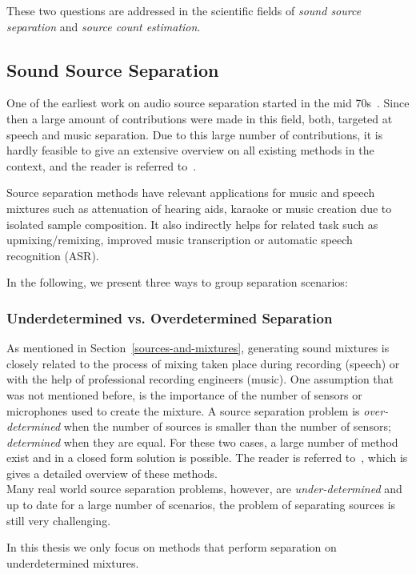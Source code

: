 These two questions are addressed in the scientific fields of \emph{sound source separation} and \emph{source count estimation}.

\subsection{Sound Source Separation}

One of the earliest work on audio source separation started in the mid 70s~\cite{miller73}.
Since then a large amount of contributions were made in this field, both, targeted at speech and music separation.
Due to this large number of contributions, it is hardly feasible to give an extensive overview on all existing methods in the context, and the reader is referred to~\cite{vincent18, comon10, rafii}.
\par
Source separation methods have relevant applications for music and speech mixtures such as attenuation of hearing aids, karaoke or music creation due to isolated sample composition.
It also indirectly helps for related task such as upmixing/remixing, improved music transcription or automatic speech recognition (ASR). 
\par
In the following, we present three ways to group separation scenarios:

\subsubsection*{Underdetermined vs. Overdetermined Separation}
As mentioned in Section~\ref{sources-and-mixtures}, generating sound mixtures is closely related to the process of mixing taken place during recording (speech) or with the help of professional recording engineers (music).
One assumption that was not mentioned before, is the importance of the number of sensors or microphones used to create the mixture.
A source separation problem is \emph{over-determined} when the number of sources is smaller than the number of sensors; \emph{determined} when they are equal.
For these two cases, a large number of method exist and in a closed form solution is possible.
The reader is referred to~\cite{common10}, which is gives a detailed overview of these methods.\\
Many real world source separation problems, however, are \emph{under-determined} and up to date for a large number of scenarios, the problem of separating sources is still very challenging.
\par
In this thesis we only focus on methods that perform separation on underdetermined mixtures.

